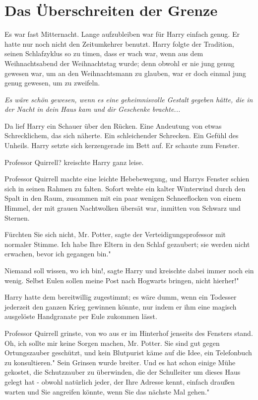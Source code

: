 \chapter{Das Überschreiten der Grenze}

Es war fast Mitternacht. Lange aufzubleiben war für Harry einfach genug. Er
hatte nur noch nicht den Zeitumkehrer benutzt. Harry folgte der Tradition,
seinen Schlafzyklus so zu timen, dass er wach war, wenn aus dem Weihnachtsabend
der Weihnachtstag wurde; denn obwohl er nie jung genug gewesen war, um an den
Weihnachtsmann zu glauben, war er doch einmal jung genug gewesen, um zu
zweifeln.

\emph{Es wäre schön gewesen, wenn es eine geheimnisvolle Gestalt gegeben hätte,
die in der Nacht in dein Haus kam und dir Geschenke brachte...}

Da lief Harry ein Schauer über den Rücken. Eine Andeutung von etwas
Schrecklichem, das sich näherte. Ein schleichender Schrecken. Ein Gefühl des
Unheils. Harry setzte sich kerzengerade im Bett auf. Er schaute zum Fenster.

\glqq{}Professor Quirrell?\grqq{} kreischte Harry ganz leise.

Professor Quirrell machte eine leichte Hebebewegung, und Harrys Fenster schien
sich in seinen Rahmen zu falten. Sofort wehte ein kalter Winterwind durch den
Spalt in den Raum, zusammen mit ein paar wenigen Schneeflocken von einem Himmel,
der mit grauen Nachtwolken übersät war, inmitten von Schwarz und Sternen.

\glqq{}Fürchten Sie sich nicht, Mr. Potter\grqq{}, sagte der
Verteidigungsprofessor mit normaler Stimme. \glqq{}Ich habe Ihre Eltern in den
Schlaf gezaubert; sie werden nicht erwachen, bevor ich gegangen bin."

\glqq{}Niemand soll wissen, wo ich bin!\grqq{}, sagte Harry und kreischte dabei
immer noch ein wenig. \glqq{}Selbst Eulen sollen meine Post nach Hogwarts
bringen, nicht hierher!"

Harry hatte dem bereitwillig zugestimmt; es wäre dumm, wenn ein Todesser
jederzeit den ganzen Krieg gewinnen könnte, nur indem er ihm eine magisch
ausgelöste Handgranate per Eule zukommen lässt.

Professor Quirrell grinste, von wo aus er im Hinterhof jenseits des Fensters
stand. \glqq{}Oh, ich sollte mir keine Sorgen machen, Mr. Potter. Sie sind gut
gegen Ortungszauber geschützt, und kein Blutpurist käme auf die Idee, ein
Telefonbuch zu konsultieren." Sein Grinsen wurde breiter. \glqq{}Und es hat
schon einige Mühe gekostet, die Schutzzauber zu überwinden, die der Schulleiter
um dieses Haus gelegt hat - obwohl natürlich jeder, der Ihre Adresse kennt,
einfach draußen warten und Sie angreifen könnte, wenn Sie das nächste Mal
gehen."

